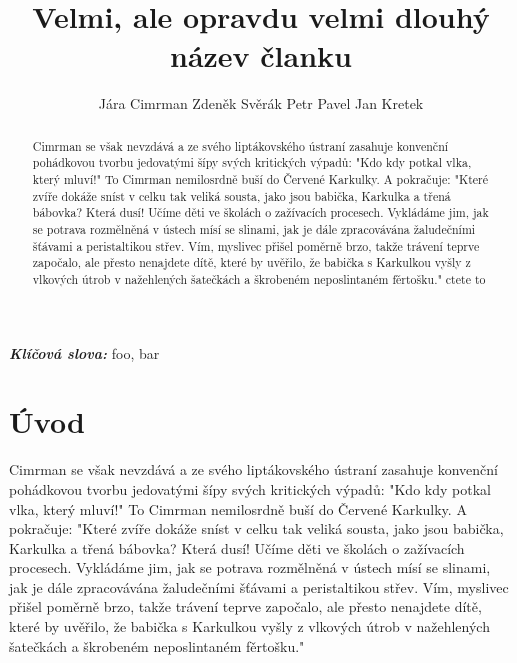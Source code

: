 \documentclass{cygclanek}
\begin{document}
\title{Velmi, ale opravdu velmi dlouhý název članku}


\newcommand{\inst}{
	\item \label{vut} VUTBR
	\item \label{ujv} UJVas
	\item \label{ujf} UJF CAS
	\item \label{kkk} KKK
}

\author{Jára Cimrman Zdeněk Svěrák Petr Pavel Jan Kretek}

\providecommand{\keywords}[1]{\textbf{\textit{Klíčová slova:}} #1}
\newcommand{\email}{cimrman\at vut.cz}
\newcommand{\rok}{2018}

\maketitle
\begin{abstract}
	
	Cimrman se však nevzdává a ze svého liptákovského ústraní zasahuje konvenční pohádkovou tvorbu jedovatými šípy svých kritických výpadů: "Kdo kdy potkal vlka, který mluví!" To Cimrman nemilosrdně buší do Červené Karkulky. A pokračuje: "Které zvíře dokáže sníst v celku tak veliká sousta, jako jsou babička, Karkulka a třená bábovka? Která dusí! Učíme děti ve školách o zažívacích procesech. Vykládáme jim, jak se potrava rozmělněná v ústech mísí se slinami, jak je dále zpracovávána žaludečními šťávami a peristaltikou střev. Vím, myslivec přišel poměrně brzo, takže trávení teprve započalo, ale přesto nenajdete dítě, které by uvěřilo, že babička s Karkulkou vyšly z vlkových útrob v nažehlených šatečkách a škrobeném neposlintaném fěrtošku."
	ctete to
\end{abstract}
\keywords{foo, bar}

\section{Úvod}
Cimrman \cite{pelikan} se \at však nevzdává a ze svého liptákovského ústraní zasahuje konvenční pohádkovou tvorbu jedovatými šípy svých kritických výpadů: "Kdo kdy potkal vlka, který mluví!" To Cimrman nemilosrdně buší do Červené Karkulky. A pokračuje: "Které zvíře dokáže sníst v celku tak veliká sousta, jako jsou babička, Karkulka a třená bábovka? Která dusí! Učíme děti ve školách o zažívacích procesech. Vykládáme jim, jak se potrava rozmělněná v ústech mísí se slinami, jak je dále zpracovávána žaludečními šťávami a peristaltikou střev. Vím, myslivec přišel poměrně brzo, takže trávení teprve započalo, ale přesto nenajdete dítě, které by uvěřilo, že babička s Karkulkou vyšly z vlkových útrob v nažehlených šatečkách a škrobeném neposlintaném fěrtošku."
\end{document}
